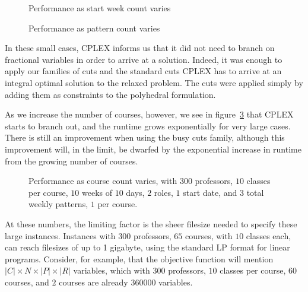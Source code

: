 \begin{figure}
\begin{center}
\caption{Performance as start week count varies}
\label{bench:startdates}
\end{center}
\end{figure}

\begin{figure}
\begin{center}
\caption{Performance as pattern count varies}
\label{bench:patterns}
\end{center}
\end{figure}

In these small cases, CPLEX informs us that it did not need to branch on fractional variables in order to arrive at a solution. Indeed, it was enough to apply our families of cuts and the standard cuts CPLEX has to arrive at an integral optimal solution to the relaxed problem. The cuts were applied simply by adding them as constraints to the polyhedral formulation.

As we increase the number of courses, however, we see in figure~\ref{bench:megacourses} that CPLEX starts to branch out, and the runtime grows exponentially for very large cases. There is still an improvement when using the busy cuts family, although this improvement will, in the limit, be dwarfed by the exponential increase in runtime from the growing number of courses.

\begin{figure}
  \begin{center}
    \caption{Performance as course count varies, with $300$ professors, $10$ classes per course, $10$ weeks of $10$ days, $2$ roles, $1$ start date, and $3$ total weekly patterns, $1$ per course.}
    \label{bench:megacourses}
  \end{center}
\end{figure}

At these numbers, the limiting factor is the sheer filesize needed to specify these large instances. Instances with $300$ professors, $65$ courses, with $10$ classes each, can reach filesizes of up to 1 gigabyte, using the standard LP format for linear programs. Consider, for example, that the objective function will mention $|C| \times N \times |P| \times |R|$ variables, which with $300$ professors, $10$ classes per course, $60$ courses, and $2$ courses are already $360000$ variables.


